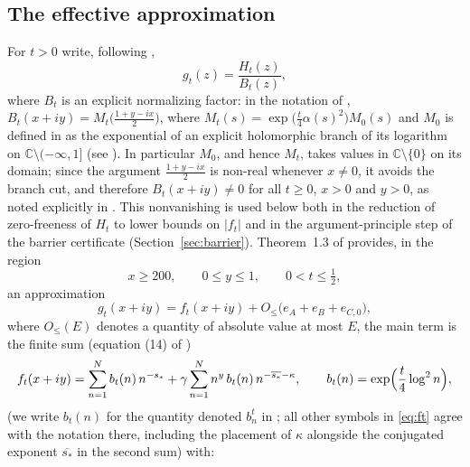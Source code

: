 \documentclass[11pt]{article}
\theoremstyle{definition}
\newcommand{\C}{\mathbb{C}}
\begin{document}
\subsection{The effective approximation}\label{sec:thm13}

For $t>0$ write, following \cite{Polymath},
\begin{equation}\label{eq:gt}
g_t(z)=\frac{H_t(z)}{B_t(z)},
\end{equation}
where $B_t$ is an explicit normalizing factor: in the notation of
\cite{Polymath}, $B_t(x+iy)=M_t\bigl(\frac{1+y-ix}{2}\bigr)$, where
$M_t(s)=\exp\bigl(\frac t4\alpha(s)^2\bigr)M_0(s)$ and $M_0$ is
defined in \cite[(6)]{Polymath} as the exponential of an explicit
holomorphic branch of its logarithm on $\C\setminus(-\infty,1]$
(see \cite[(7)]{Polymath}). In particular $M_0$, and hence $M_t$,
takes values in $\C\setminus\{0\}$ on its domain; since the argument
$\frac{1+y-ix}{2}$ is non-real whenever $x\neq0$, it avoids the
branch cut, and therefore $B_t(x+iy)\neq0$ for all $t\ge0$, $x>0$ and
$y>0$, as noted explicitly in \cite[\S1, after (11)]{Polymath}. This
nonvanishing is used below both in the reduction of zero-freeness of
$H_t$ to lower bounds on $|f_t|$ and in the argument-principle step
of the barrier certificate (Section~\ref{sec:barrier}).
Theorem~1.3 of \cite{Polymath} provides, in the region
\begin{equation}\label{eq:region}
x\ge200,\qquad 0\le y\le1,\qquad 0<t\le\tfrac12,
\end{equation}
an approximation
\begin{equation}\label{eq:thm13}
g_t(x+iy)=f_t(x+iy)+O_{\le}\bigl(e_A+e_B+e_{C,0}\bigr),
\end{equation}
where $O_\le(E)$ denotes a quantity of absolute value at most $E$, the
main term is the finite sum (equation (14) of \cite{Polymath})
\begin{equation}\label{eq:ft}
f_t(x+iy)
=\sum_{n=1}^{N}b_t(n)\,n^{-s_*}
+\gamma\sum_{n=1}^{N}n^{y}\,b_t(n)\,n^{-\overline{s_*}-\kappa},
\qquad
b_t(n)=\exp\Bigl(\frac t4\log^2 n\Bigr),
\end{equation}
(we write $b_t(n)$ for the quantity denoted $b_n^t$ in
\cite{Polymath}; all other symbols in \eqref{eq:ft} agree with the
notation there, including the placement of $\kappa$ alongside the
conjugated exponent $\overline{s_*}$ in the second sum)
with:
\end{document}
